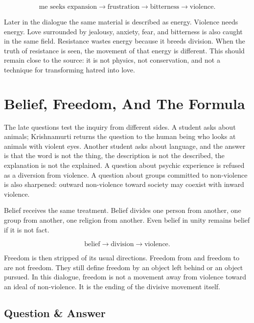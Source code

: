 \documentclass[11pt,oneside]{book}
\begin{document}
\begin{equation}
\text{me seeks expansion}
\longrightarrow
\text{frustration}
\longrightarrow
\text{bitterness}
\longrightarrow
\text{violence}.
\end{equation}

Later in the dialogue the same material is described as energy. Violence needs energy. Love surrounded by jealousy, anxiety, fear, and bitterness is also caught in the same field. Resistance wastes energy because it breeds division. When the truth of resistance is seen, the movement of that energy is different. This should remain close to the source: it is not physics, not conservation, and not a technique for transforming hatred into love.

\section{Belief, Freedom, And The Formula}

The late questions test the inquiry from different sides. A student asks about animals; Krishnamurti returns the question to the human being who looks at animals with violent eyes. Another student asks about language, and the answer is that the word is not the thing, the description is not the described, the explanation is not the explained. A question about psychic experience is refused as a diversion from violence. A question about groups committed to non-violence is also sharpened: outward non-violence toward society may coexist with inward violence.

Belief receives the same treatment. Belief divides one person from another, one group from another, one religion from another. Even belief in unity remains belief if it is not fact.

\begin{equation}
\text{belief}
\longrightarrow
\text{division}
\longrightarrow
\text{violence}.
\end{equation}

Freedom is then stripped of its usual directions. Freedom from and freedom to are not freedom. They still define freedom by an object left behind or an object pursued. In this dialogue, freedom is not a movement away from violence toward an ideal of non-violence. It is the ending of the divisive movement itself.

\subsection{Question \& Answer}
\end{document}
